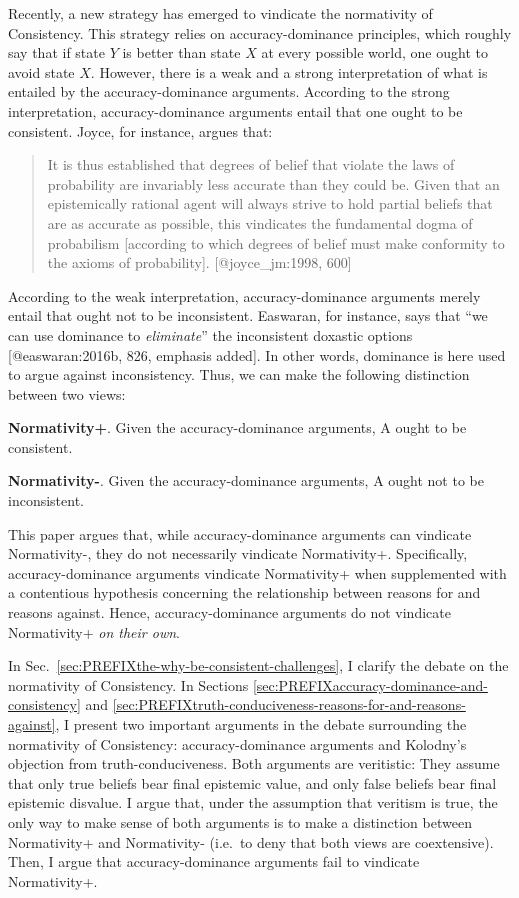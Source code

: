 \documentclass[
]{article}
\begin{document}
Recently, a new strategy has emerged to vindicate the normativity of
Consistency. This strategy relies on accuracy-dominance principles,
which roughly say that if state \(Y\) is better than state \(X\) at
every possible world, one ought to avoid state \(X\). However, there is
a weak and a strong interpretation of what is entailed by the
accuracy-dominance arguments. According to the strong interpretation,
accuracy-dominance arguments entail that one ought to be consistent.
Joyce, for instance, argues that:

\begin{quote}
It is thus established that degrees of belief that violate the laws of
probability are invariably less accurate than they could be. Given that
an epistemically rational agent will always strive to hold partial
beliefs that are as accurate as possible, this vindicates the
fundamental dogma of probabilism {[}according to which degrees of belief
must make conformity to the axioms of probability{]}.
{[}@joyce\_jm:1998, 600{]}
\end{quote}

According to the weak interpretation, accuracy-dominance arguments
merely entail that ought not to be inconsistent. Easwaran, for instance,
says that ``we can use dominance to \emph{eliminate}'' the inconsistent
doxastic options {[}@easwaran:2016b, 826, emphasis added{]}. In other
words, dominance is here used to argue against inconsistency. Thus, we
can make the following distinction between two views:

\textbf{Normativity+}. Given the accuracy-dominance arguments, A ought
to be consistent.

\textbf{Normativity-}. Given the accuracy-dominance arguments, A ought
not to be inconsistent.

\noindent This paper argues that, while accuracy-dominance arguments can
vindicate Normativity-, they do not necessarily vindicate Normativity+.
Specifically, accuracy-dominance arguments vindicate Normativity+ when
supplemented with a contentious hypothesis concerning the relationship
between reasons for and reasons against. Hence, accuracy-dominance
arguments do not vindicate Normativity+ \emph{on their own}.

In Sec.~\ref{sec:PREFIXthe-why-be-consistent-challenges}, I clarify the
debate on the normativity of Consistency. In Sections
\ref{sec:PREFIXaccuracy-dominance-and-consistency} and
\ref{sec:PREFIXtruth-conduciveness-reasons-for-and-reasons-against}, I
present two important arguments in the debate surrounding the
normativity of Consistency: accuracy-dominance arguments and Kolodny's
objection from truth-conduciveness. Both arguments are veritistic: They
assume that only true beliefs bear final epistemic value, and only false
beliefs bear final epistemic disvalue. I argue that, under the
assumption that veritism is true, the only way to make sense of both
arguments is to make a distinction between Normativity+ and Normativity-
(i.e.~to deny that both views are coextensive). Then, I argue that
accuracy-dominance arguments fail to vindicate Normativity+.
\end{document}
